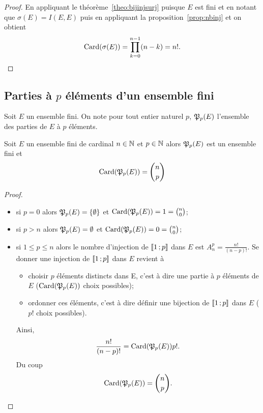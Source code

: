 \begin{proof}
  En appliquant le théorème~\ref{theo:bijinjsurj} puisque $E$ est fini et en notant que $\sigma(E)=I(E,E)$ puis en appliquant la proposition~\ref{prop:nbinj} et on obtient
  \begin{equation}
    \operatorname{Card}(\sigma(E))=\prod_{k=0}^{n-1}(n-k)=n!.
  \end{equation}
\end{proof}

\subsection{Parties à $p$ éléments d'un ensemble fini}

Soit $E$ un ensemble fini. On note pour tout entier naturel $p$, $\mathfrak{P}_p(E)$ l'ensemble des parties de $E$ à $p$ éléments.
\begin{prop}\label{prop:ppartiesfinies}
  Soit $E$ un ensemble fini de cardinal $n\in \mathbb{N}$ et $p \in \mathbb{N}$ alors $\mathfrak{P}_p(E)$ est un ensemble fini et
  \begin{equation}
    \operatorname{Card}(\mathfrak{P}_p(E))=\binom{n}{p}
  \end{equation}
\end{prop}
\begin{proof}
  \begin{itemize}
  \item si $p=0$ alors $\mathfrak{P}_p(E)=\{\emptyset\}$ et $\operatorname{Card}(\mathfrak{P}_p(E))=1=\binom{n}{0}$;
  \item si $p>n$ alors $\mathfrak{P}_p(E)=\emptyset$ et $\operatorname{Card}(\mathfrak{P}_p(E))=0=\binom{n}{0}$;
  \item si $1\leq p \leq n$ alors le nombre d'injection de $\mathopen{\llbracket}1\mathclose{}\mathpunct{};p\mathclose{\rrbracket}$ dans $E$ est $A_{n}^p=\frac{n!}{(n-p)!}$. Se donner une injection de  $\mathopen{\llbracket}1\mathclose{}\mathpunct{};p\mathclose{\rrbracket}$ dans $E$ revient à
    \begin{itemize}
    \item choisir $p$ éléments distincts dans E, c'est à dire une partie à $p$ éléments de $E$ ($\operatorname{Card}(\mathfrak{P}_p(E))$ choix possibles);
    \item ordonner ces éléments, c'est à dire définir une bijection de $\mathopen{\llbracket}1\mathclose{}\mathpunct{};p\mathclose{\rrbracket}$ dans $E$ ($p!$ choix possibles).
    \end{itemize}
    Ainsi,
    \begin{equation}
      \frac{n!}{(n-p)!}=\operatorname{Card}(\mathfrak{P}_p(E)) p!.
    \end{equation}
    Du coup
    \begin{equation}
      \operatorname{Card}(\mathfrak{P}_p(E))=\binom{n}{p}.
    \end{equation}
  \end{itemize}
\end{proof}
